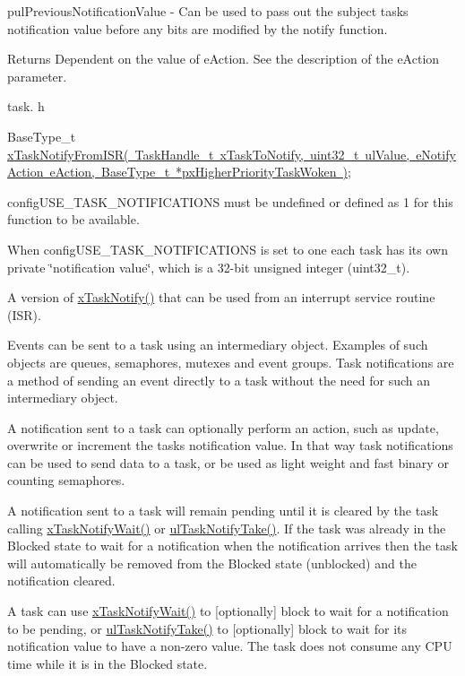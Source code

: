 pul\+Previous\+Notification\+Value -\/ Can be used to pass out the subject task\textquotesingle{}s notification value before any bits are modified by the notify function.

\begin{DoxyReturn}{Returns}
Dependent on the value of e\+Action. See the description of the e\+Action parameter.
\end{DoxyReturn}
task. h 
\begin{DoxyPre}BaseType\_t \mbox{\hyperlink{task_8h_a1ed9129068b96a909356bd0369c5ecb0}{xTaskNotifyFromISR( TaskHandle\_t xTaskToNotify, uint32\_t ulValue, eNotifyAction eAction, BaseType\_t *pxHigherPriorityTaskWoken )}};\end{DoxyPre}


config\+U\+S\+E\+\_\+\+T\+A\+S\+K\+\_\+\+N\+O\+T\+I\+F\+I\+C\+A\+T\+I\+O\+NS must be undefined or defined as 1 for this function to be available.

When config\+U\+S\+E\+\_\+\+T\+A\+S\+K\+\_\+\+N\+O\+T\+I\+F\+I\+C\+A\+T\+I\+O\+NS is set to one each task has its own private \char`\"{}notification value\char`\"{}, which is a 32-\/bit unsigned integer (uint32\+\_\+t).

A version of \mbox{\hyperlink{task_8h_a0d2d54fb8a64011dfbb54983e4ed06bd}{x\+Task\+Notify()}} that can be used from an interrupt service routine (I\+SR).

Events can be sent to a task using an intermediary object. Examples of such objects are queues, semaphores, mutexes and event groups. Task notifications are a method of sending an event directly to a task without the need for such an intermediary object.

A notification sent to a task can optionally perform an action, such as update, overwrite or increment the task\textquotesingle{}s notification value. In that way task notifications can be used to send data to a task, or be used as light weight and fast binary or counting semaphores.

A notification sent to a task will remain pending until it is cleared by the task calling \mbox{\hyperlink{task_8h_a0475fcda9718f403521c270a7270ff93}{x\+Task\+Notify\+Wait()}} or \mbox{\hyperlink{task_8h_a66540bef602522a01a519f776e4c07d8}{ul\+Task\+Notify\+Take()}}. If the task was already in the Blocked state to wait for a notification when the notification arrives then the task will automatically be removed from the Blocked state (unblocked) and the notification cleared.

A task can use \mbox{\hyperlink{task_8h_a0475fcda9718f403521c270a7270ff93}{x\+Task\+Notify\+Wait()}} to \mbox{[}optionally\mbox{]} block to wait for a notification to be pending, or \mbox{\hyperlink{task_8h_a66540bef602522a01a519f776e4c07d8}{ul\+Task\+Notify\+Take()}} to \mbox{[}optionally\mbox{]} block to wait for its notification value to have a non-\/zero value. The task does not consume any C\+PU time while it is in the Blocked state.

